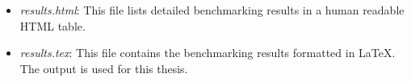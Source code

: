 \begin{itemize}
\begin{itemize}
	\item \textit{results.html}: This file lists detailed benchmarking results in a human readable \gls{HTML} table. 
	
	\item \textit{results.tex}: This file contains the benchmarking results formatted in LaTeX. The output is used for this thesis.
	\end{itemize}

\end{itemize}
